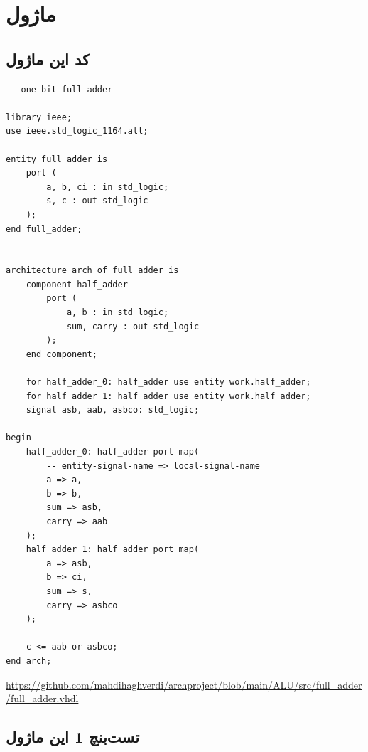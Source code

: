 \documentclass[dvipsnames, svgnames, x11names, a4paper, 11pt, oneside]{book}
\begin{document}
				\section{ماژول }
					\subsection{کد این ماژول}
					
						\begin{latin}
							\begin{lstlisting}
-- one bit full adder

library ieee;
use ieee.std_logic_1164.all;

entity full_adder is
	port (
		a, b, ci : in std_logic;
		s, c : out std_logic
	);
end full_adder;


architecture arch of full_adder is
	component half_adder
		port (
			a, b : in std_logic;
			sum, carry : out std_logic
		);
	end component;

	for half_adder_0: half_adder use entity work.half_adder;
	for half_adder_1: half_adder use entity work.half_adder;
	signal asb, aab, asbco: std_logic;

begin
	half_adder_0: half_adder port map(
		-- entity-signal-name => local-signal-name
		a => a,
		b => b,
		sum => asb,
		carry => aab
	);
	half_adder_1: half_adder port map(
		a => asb,
		b => ci,
		sum => s,
		carry => asbco
	);

	c <= aab or asbco;
end arch;
							\end{lstlisting}
							\url{https://github.com/mahdihaghverdi/archproject/blob/main/ALU/src/full_adder/full_adder.vhdl}
						\end{latin}
					\subsection{تست‌‌بنچ 1 این ماژول}
					
\end{document}
